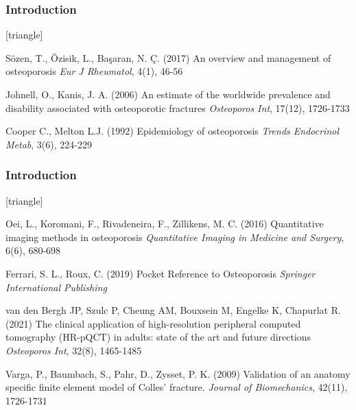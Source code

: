 \documentclass[xcolor=table,11pt]{beamer}
\begin{document}
	\begin{frame}
		\frametitle{Introduction}
		\footnotesize{
				\begin{thebibliography}{99}
						[triangle]
						
						 Sözen, T., Özisik, L., Başaran, N. Ç. (2017)
						\newblock An overview and management of osteoporosis
						\newblock \textit{Eur J Rheumatol}, 4(1), 46-56

						Johnell, O., Kanis, J. A. (2006)
						\newblock An estimate of the worldwide prevalence and disability associated with osteoporotic fractures
						\newblock \textit{Osteoporos Int}, 17(12), 1726-1733

						 Cooper C., Melton L.J. (1992)
						\newblock Epidemiology of osteoporosis
						\newblock \textit{Trends Endocrinol Metab}, 3(6), 224-229
						
					\end{thebibliography}
			}
	\end{frame}

	\begin{frame}
		\frametitle{Introduction}
		\footnotesize{
				\begin{thebibliography}{99}
						\setbeamertemplate{bibliography item}[triangle]
						
						 Oei, L., Koromani, F., Rivadeneira, F., Zillikens, M. C. (2016)
						\newblock Quantitative imaging methods in osteoporosis
						\newblock \textit{Quantitative Imaging in Medicine and Surgery}, 6(6), 680-698
						
						  Ferrari, S. L., Roux, C. (2019)
						\newblock Pocket Reference to Osteoporosis
						\newblock \textit{Springer International Publishing}

						  van den Bergh JP, Szulc P, Cheung AM, Bouxsein M, Engelke K, Chapurlat R. (2021)
						\newblock The clinical application of high-resolution peripheral computed tomography (HR-pQCT) in adults: state of the art and future directions
						\newblock \textit{Osteoporos Int}, 32(8), 1465-1485

						  Varga, P., Baumbach, S., Pahr, D., Zysset, P. K. (2009)
						\newblock Validation of an anatomy specific finite element model of Colles' fracture.
						\newblock \textit{Journal of Biomechanics}, 42(11), 1726-1731
						
					\end{thebibliography}
			}
	\end{frame}
\end{document}
